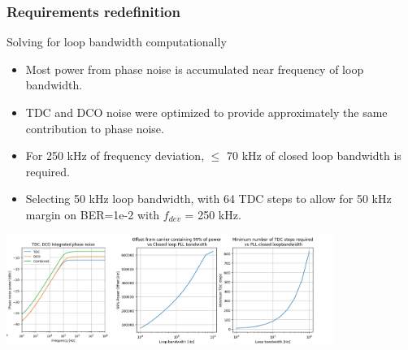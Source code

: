 \documentclass[t, screen, aspectratio=43]{beamer}
\begin{document}
\begin{frame}
	\frametitle{Requirements redefinition}
	\begin{block}{Solving for loop bandwidth computationally}
		\begin{itemize}
			\scriptsize
			\item Most power from phase noise is accumulated near frequency of loop bandwidth.
			\item TDC and DCO noise were optimized to provide approximately the same contribution to phase noise.
			\item For 250 kHz of frequency deviation, $\leq$ 70 kHz of closed loop bandwidth is required. 
			\item Selecting 50 kHz loop bandwidth, with 64 TDC steps to allow for 50 kHz margin on BER=1e-2 with $f_{dev}$ = 250 kHz.
		\end{itemize}
			\vspace{-0.5em}
			\center\includegraphics[width=0.8\textwidth, angle=0]{pow_integ.png}
			\vspace{-0.5em} 	
	\end{block}
\end{frame}
\end{document}
